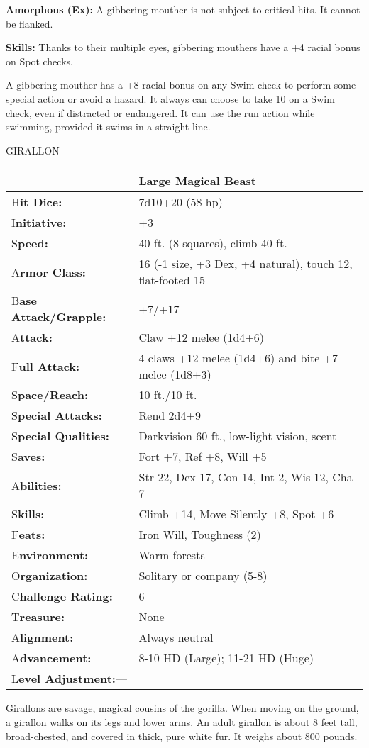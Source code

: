 \documentclass{article}
\begin{document}
\textbf{Amorphous (Ex):} A gibbering mouther is not subject to critical hits. It 
cannot be flanked.

\textbf{Skills: }Thanks to their multiple eyes, gibbering mouthers have a +4 racial 
bonus on Spot checks.

A gibbering mouther has a +8 racial bonus on any Swim check to perform some special 
action or avoid a hazard. It always can choose to take 10 on a Swim check, even 
if distracted or endangered. It can use the run action while swimming, provided 
it swims in a straight line.

\vspace{12pt}
{\LARGE{}GIRALLON}

\begin{tabular}{|>{\raggedright}p{91pt}|>{\raggedright}p{226pt}|}
\hline
  & Large Magical Beast\tabularnewline
\hline
H\textbf{it Dice:} & 7d10+20 (58 hp)\tabularnewline
\hline
I\textbf{nitiative:} & +3\tabularnewline
\hline
S\textbf{peed:} & 40 ft. (8 squares), climb 40 ft.\tabularnewline
\hline
A\textbf{rmor Class:} & 16 (-1 size, +3 Dex, +4 natural), touch 12, flat-footed 
15\tabularnewline
\hline
B\textbf{ase Attack/Grapple:} & +7/+17\tabularnewline
\hline
A\textbf{ttack:} & Claw +12 melee (1d4+6)\tabularnewline
\hline
F\textbf{ull Attack:} & 4 claws +12 melee (1d4+6) and bite +7 melee (1d8+3)\tabularnewline
\hline
S\textbf{pace/Reach:} & 10 ft./10 ft.\tabularnewline
\hline
S\textbf{pecial Attacks:} & Rend 2d4+9\tabularnewline
\hline
S\textbf{pecial Qualities:} & Darkvision 60 ft., low-light vision, scent\tabularnewline
\hline
S\textbf{aves:} & Fort +7, Ref +8, Will +5\tabularnewline
\hline
A\textbf{bilities:} & Str 22, Dex 17, Con 14, Int 2, Wis 12, Cha 7\tabularnewline
\hline
S\textbf{kills:} & Climb +14, Move Silently +8, Spot +6\tabularnewline
\hline
F\textbf{eats:} & Iron Will, Toughness (2)\tabularnewline
\hline
E\textbf{nvironment:} & Warm forests\tabularnewline
\hline
O\textbf{rganization:} & Solitary or company (5-8)\tabularnewline
\hline
C\textbf{hallenge Rating:} & 6\tabularnewline
\hline
T\textbf{reasure:} & None\tabularnewline
\hline
A\textbf{lignment:} & Always neutral\tabularnewline
\hline
A\textbf{dvancement:} & 8-10 HD (Large); 11-21 HD (Huge)\tabularnewline
\hline
L\textbf{evel Adjustment:}--- & \tabularnewline
\hline
\end{tabular}

Girallons are savage, magical cousins of the gorilla. When moving on the ground, 
a girallon walks on its legs and lower arms. An adult girallon is about 8 feet 
tall, broad-chested, and covered in thick, pure white fur. It weighs about 800 
pounds.
\end{document}
